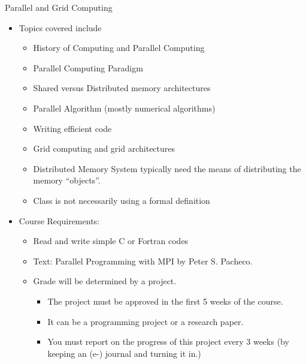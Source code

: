 Parallel and Grid Computing 
 
\begin{itemize}
\item Topics covered include
\begin{itemize}
\item History of Computing and Parallel Computing
\item Parallel Computing Paradigm
\item Shared versus Distributed memory architectures
\item Parallel Algorithm (mostly numerical algorithms)
\item Writing efficient code 
\item Grid computing and grid architectures
\item Distributed Memory System typically need the means of distributing the memory ``objects''.  
\item Class is not necessarily using a formal definition 
\end{itemize}
\item Course Requirements:
\begin{itemize}
\item Read and write simple C or Fortran codes 
\item Text: Parallel Programming with MPI by Peter S. Pacheco.
\item Grade will be determined by a project.
\begin{itemize}
\item The project must be approved in the first 5 weeks of the course.
\item It can be a programming project or a research paper.
\item You must report on the progress of this project every 3 weeks (by keeping an (e-) journal and turning it in.)
\end{itemize}


\end{itemize}
\end{itemize}
